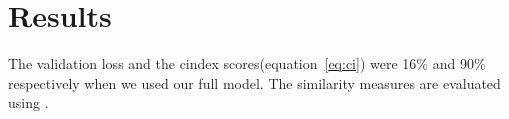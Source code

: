 \section{Results}
The validation loss and the cindex scores(equation~\ref{eq:ci}) were 16\% and 90\% respectively when we used our full model. The similarity measures are evaluated using \cite{Cock2009}.

\iffalse
The accuracy plots and cindex plots are shown in Figure ~\ref{fig:results}
\begin{figure}
    
\end{figure}
\fi
